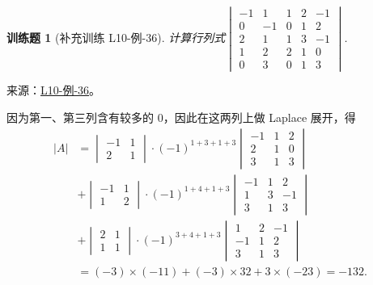 \documentclass[UTF8,12pt,a4paper,fontset=fandol]{ctexart}
\newtheorem{exercise}{训练题}[section]
\begin{document}
\begin{exercise}[补充训练 L10-例-36]\label{prob:L10-例-36}
计算行列式$\begin{vmatrix}
            -1 & 1  & 1 & 2 & -1 \\
            0  & -1 & 0 & 1 & 2  \\
            2  & 1  & 1 & 3 & -1 \\
            1  & 2  & 2 & 1 & 0  \\
            0  & 3  & 0 & 1 & 3
        \end{vmatrix}$.
\end{exercise}
\noindent 来源：\href{https://github.com/yhwu-is/Linear-Algebra-Left-Undone/blob/new/%E8%AE%B2%E4%B9%89/%E4%B8%93%E9%A2%98/10%20%E8%A1%8C%E5%88%97%E5%BC%8F.tex}{L10-例-36}。
\begin{solve}
因为第一、第三列含有较多的 $0$，因此在这两列上做 Laplace 展开，得
    \begin{align*}
        |A| & = \begin{vmatrix}
                    -1 & 1 \\ 2 & 1
                \end{vmatrix} \cdot (-1)^{1+3+1+3}
        \begin{vmatrix}
            -1 & 1 & 2 \\ 2 & 1 & 0 \\ 3 & 1 & 3
        \end{vmatrix}                                 \\
            & + \begin{vmatrix}
                    -1 & 1 \\ 1 & 2
                \end{vmatrix} \cdot (-1)^{1+4+1+3}
        \begin{vmatrix}
            -1 & 1 & 2 \\ 1 & 3 & -1 \\ 3 & 1 & 3
        \end{vmatrix}                                \\
            & + \begin{vmatrix}
                    2 & 1 \\ 1 & 1
                \end{vmatrix} \cdot (-1)^{3+4+1+3}
        \begin{vmatrix}
            1 & 2 & -1 \\ -1 & 1 & 2 \\ 3 & 1 & 3
        \end{vmatrix}                                \\
            & = (-3) \times (-11) + (-3) \times 32 + 3 \times (-23) = -132.
    \end{align*}
\end{solve}
\end{document}
